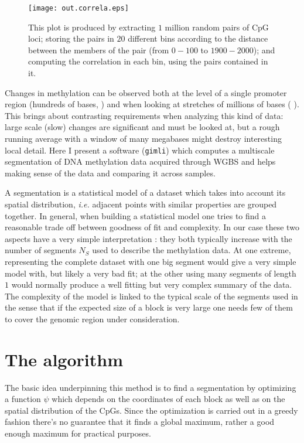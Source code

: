 \documentclass[12pt]{amsart}
\newcommand{\gimli}{\texttt{gimli}}
\newcommand{\ie}{\textit{i.e.}}
\begin{document}
\begin{center}
\begin{figure}\label{fig_corr}
\texttt{[image: out.correla.eps]}
\caption{This plot is produced by extracting $1$ million random pairs of CpG loci;
storing the pairs in $20$ different bins  according to the distance between the members
of the pair (from $0-100$ to $1900-2000$); and computing the correlation in each bin,
using the pairs contained in it.}
\end{figure}
\end{center}
 
Changes in methylation can be observed both at the level of a single promoter
region (hundreds of bases, \cite{methylseekr}) and when looking at stretches
of millions of bases (\cite{largeblocks} ).
This brings about contrasting requirements when analyzing this kind of data: large scale (slow) changes are 
significant and must be looked at, but a rough
running average with a window of many megabases might destroy interesting
local detail. Here I present  a software (\gimli{}) which computes a multiscale segmentation 
of DNA methylation 
data acquired through WGBS and helps making sense of the data and comparing
it across samples.

A segmentation is a statistical model of a dataset  which takes into account its spatial distribution,
\ie{} adjacent points with similar properties are grouped together.
In general, when building a statistical model one tries to find a reasonable 
trade off between goodness of fit and complexity.
In our case these two aspects have a very simple interpretation : they both typically 
increase with the number of segments $N_S$ used to describe the 
methylation data.  
At one extreme, representing the complete dataset with one big segment would 
give a very simple model with, but likely a very bad fit;  
at the other using many segments of length $1$ would normally produce
a well fitting but very complex summary of the data.
The complexity of the model is linked to the typical scale of the segments used
in the sense that if the expected size of a block is very large one needs few of them to 
cover the genomic region under consideration.

\section{The algorithm}
The basic idea underpinning this method is to find a segmentation
by optimizing  a function $\psi$ which depends on the coordinates
of each block as well as on the spatial distribution of the CpGs.
Since the optimization is carried out
in a greedy fashion there's no guarantee
that it finds a global maximum, rather a good enough maximum for practical
purposes.
\end{document}
